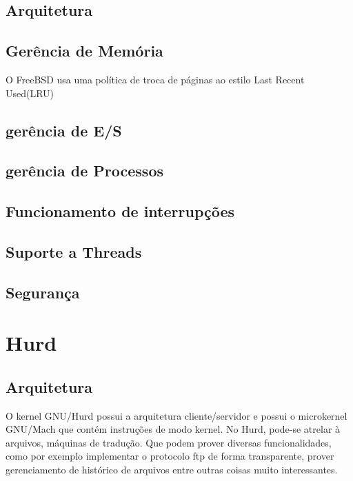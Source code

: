 \documentclass[conference]{IEEEtran}
\begin{document}
\subsection{Arquitetura}\label{sec:BSDArq}

\subsection{Gerência de Memória}\label{sec:BSDMem}
O FreeBSD usa uma política de troca de páginas ao estilo Last Recent Used(LRU)\cite{FreeBsdArc}

\subsection{gerência de E/S}\label{sec:BSDES}

\subsection{gerência de Processos}\label{sec:BSDPROC}

\subsection{Funcionamento de interrupções}\label{sec:BSDInt}

\subsection{Suporte a Threads}\label{sec:BSDThreads}

\subsection{Segurança}\label{sec:BSDSec}

\section{Hurd}\label{sec:Hurd}

\subsection{Arquitetura}\label{sec:HurdArq}
O kernel GNU/Hurd possui a arquitetura cliente/servidor e possui o microkernel GNU/Mach que contém instruções de modo kernel. No Hurd, pode-se atrelar à arquivos, máquinas de tradução. Que podem prover diversas funcionalidades, como por exemplo implementar o protocolo ftp de forma transparente, prover gerenciamento de histórico de arquivos entre outras coisas muito interessantes.\cite{HurdPaper}
\end{document}
